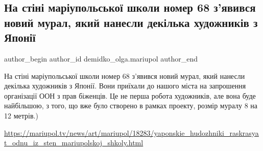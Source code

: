  
 
 
 
 

\subsection{На стіні маріупольської школи номер 68 з'явився новий мурал, який нанесли  декілька художників з Японії}
\label{sec:29_07_2017.fb.demidko_olga.mariupol.1.na_st_n__mar_upolsko}

\ifcmt
 author_begin
   author_id demidko_olga.mariupol
 author_end
\fi

На стіні маріупольської школи номер 68 з'явився новий мурал, який нанесли
декілька художників з Японії. Вони приїхали до нашого міста на запрошення
організації ООН з прав біженців. Це не перша робота художників, але вона буде
найбільшою, з того, що вже було створено в рамках проекту, розмір муралу 8 на
12 метрів.) 

\url{https://mariupol.tv/news/art/mariupol/18283/yaponskie_hudozhniki_raskrasyat_odnu_iz_sten_mariupolskoj_shkoly.html}

